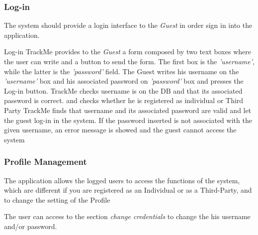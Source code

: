 \documentclass[a4paper]{article}
\begin{document}
        
        \subsubsection{Log-in}
        The system should provide a login interface to the \textit{Guest} in order sign in into the application.
        
        
        \begin{usecase}{Log-in}
              {TrackMe provides to the \textit{Guest} a form composed by two text boxes where the user can write and a button to send the form. The first box is the \textit{'username'}, while the latter is the \textit{'password'} field.}
              {The Guest writes his username on the \textit{'username'} box and his associated password on \textit{'password'} box and presses the Log-in button.}
              {TrackMe checks username is on the DB and that its associated password is correct. and checks whether he is  registered as individual or Third Party}
              {TrackMe finds that username and its associated password are valid and let the guest log-in in the system.}
        {If the password inserted is not associated with the given username, an error message is showed and the guest cannot access the system}
        \end{usecase}
        
        
        \subsubsection{Profile Management }
        The application allows the logged users to access the functions of the system, which are different if you are registered as an Individual or as a Third-Party, and to change the setting of the Profile
        
        The user can access to the section \textit{change credentials} to change the his username and/or password.
        
        
        
\end{document}

